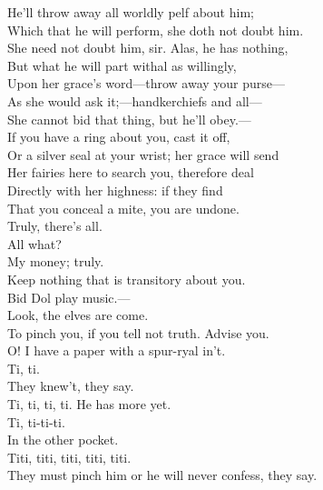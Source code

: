 \documentclass[a4paper,oneside]{memoir}
\begin{document}
\begin{drama*}
He'll throw away all worldly pelf about him;\\
Which that he will perform, she doth not doubt him.\\
\facespeaks She need not doubt him, sir. Alas, he has nothing,\\
But what he will part withal as willingly,\\
Upon her grace's word---throw away your purse---\\
As she would ask it;---handkerchiefs and all---\\
She cannot bid that thing, but he'll obey.---\\
If you have a ring about you, cast it off,\\
Or a silver seal at your wrist; her grace will send\\
Her fairies here to search you, therefore deal\\
Directly with her highness: if they find\\
That you conceal a mite, you are undone.\\
\dapperspeaks Truly, there's all.\\
\facespeaks {} All what?\\
\dapperspeaks {} My money; truly.\\
\facespeaks Keep nothing that is transitory about you.\\
Bid Dol play music.---\\
 Look, the elves are come.\\
To pinch you, if you tell not truth. Advise you.\\
\dapperspeaks O! I have a paper with a spur-ryal in't.\\
\facespeaks Ti, ti.\\
They knew't, they say.\\
\subtlespeaks {} Ti, ti, ti, ti. He has more yet.\\
\facespeaks Ti, ti-ti-ti.\\
In the other pocket.\\
\subtlespeaks {} Titi, titi, titi, titi, titi.\\
They must pinch him or he will never confess, they say.\\

\end{drama*}
\end{document}
